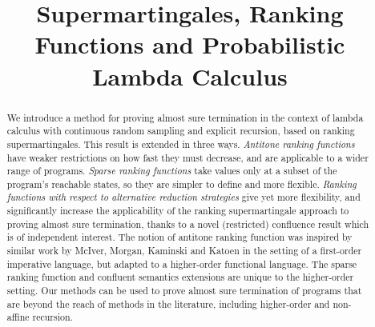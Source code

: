 \documentclass[conference]{IEEEtran}
\begin{document}
\title{Supermartingales, Ranking Functions and Probabilistic Lambda Calculus}


\author{
\and
{}
}

\maketitle

\begin{abstract}
We introduce a method for proving almost sure termination in the context of lambda calculus with continuous random sampling and explicit recursion, based on ranking supermartingales. 
This result is extended in three ways. 
\emph{Antitone ranking functions} have weaker restrictions on how fast they must decrease, and are applicable to a wider range of programs. 
\emph{Sparse ranking functions} take values only at a subset of the program's reachable states, so they are simpler to define and more flexible. 
\emph{Ranking functions with respect to alternative reduction strategies} give yet more flexibility, and significantly increase the applicability of the ranking supermartingale approach to proving almost sure termination, thanks to a novel (restricted) confluence result which is of independent interest.
The notion of antitone ranking function was inspired by similar work by McIver, Morgan, Kaminski and Katoen in the setting of a first-order imperative language, but adapted to a higher-order functional language.
The sparse ranking function and confluent semantics extensions are unique to the higher-order setting.
Our methods can be used to prove almost sure termination of programs that are beyond the reach of methods in the literature, including higher-order and non-affine recursion.
\end{abstract}

\IEEEpeerreviewmaketitle












\end{document}

